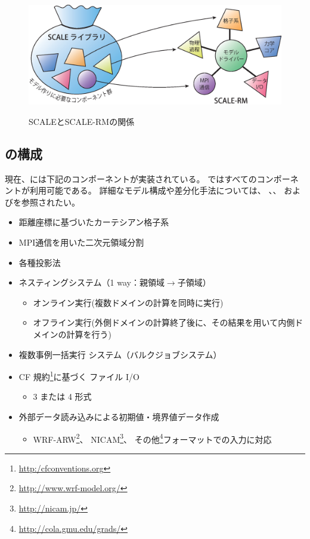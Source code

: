 \begin{figure}[hbt]
\begin{center}
  \includegraphics[width=0.9\hsize]{./figure/scale.eps}\\
  \caption{SCALEとSCALE-RMの関係}
  \label{fig:scale-rm}
\end{center}
\end{figure}




\subsection{\scalerm の構成}  \label{subsec:sturcture_scale_rm}
現在、\scalerm には下記のコンポーネントが実装されている。
\scalerm ではすべてのコンポーネントが利用可能である。
詳細なモデル構成や差分化手法については、
\citet{scale_2015}、\citet{satoy_2015b}、
および\citet{nishizawa_2015}を参照されたい。\\


\begin{itemize}
 \item 距離座標に基づいたカーテシアン格子系
 \item MPI通信を用いた二次元領域分割
 \item 各種投影法
 \item ネスティングシステム（1 way：親領域$\to$子領域）
   \begin{itemize}
    \item オンライン実行(複数ドメインの計算を同時に実行)
    \item オフライン実行(外側ドメインの計算終了後に、その結果を用いて内側ドメインの計算を行う)
   \end{itemize}
 \item 複数事例一括実行 システム（バルクジョブシステム）
 \item CF 規約\footnote{\url{http:/cfconventions.org}}に基づく \netcdf ファイル I/O
   \begin{itemize}
   \item {\netcdf}3 または {\netcdf}4 形式
   \end{itemize}
 \item 外部データ読み込みによる初期値・境界値データ作成
   \begin{itemize}
    \item WRF-ARW\footnote{\url{http://www.wrf-model.org/}}、
      NICAM\footnote{\url{http://nicam.jp/}}、
      その他\grads \footnote{\url{http://cola.gmu.edu/grads/}}フォーマットでの入力に対応
   \end{itemize}
\end{itemize}

